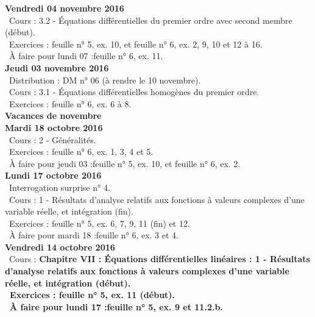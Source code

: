 \documentclass[12pt,a4paper]{article}
\begin{document}
\noindent\textbf{Vendredi 04 novembre 2016}\\
\bu\ Cours : 3.2 - Équations différentielles du premier ordre avec 
second membre (début).\\
\bu\ Exercices : feuille n° 5, ex. 10, et feuille n° 6, ex. 2, 9, 10 et 12 à 16.\\
\bu\ À faire pour lundi 07 :feuille n° 6, ex. 11.\vspace{.4cm}\\

\noindent\textbf{Jeudi 03 novembre 2016}\\
\bu\ Distribution : DM n° 06 (à rendre le 10 novembre).\\
\bu\ Cours : 3.1 - Équations différentielles homogènes du premier ordre.\\
\bu\ Exercices : feuille n° 6, ex. 6 à 8.\vspace{.4cm}\\

\noindent\textbf{ Vacances de novembre }\vspace{.4cm}\\

\noindent\textbf{\bf Mardi 18 octobre 2016}\\
\bu\ Cours : 2 - Généralités.\\
\bu\ Exercices : feuille n° 6, ex. 1, 3, 4 et 5.\\
\bu\ À faire pour jeudi 03 :feuille n° 5, ex. 10, et feuille n° 6, ex. 2.\vspace{.4cm}\\

\noindent\textbf{Lundi 17 octobre 2016}\\
\bu\ Interrogation surprise n° 4.\\
\bu\ Cours : 1 - Résultats d'analyse relatifs aux fonctions à valeurs complexes d'une variable réelle, et 
intégration (fin).\\
\bu\ Exercices : feuille n° 5, ex. 6, 7, 9, 11 (fin) et 12.\\
\bu\ À faire pour mardi 18 :feuille n° 6, ex. 3 et 4.\vspace{.4cm}\\
   
\noindent\textbf{Vendredi 14 octobre 2016}\\
\bu\ Cours : \bf Chapitre VII \rm : Équations différentielles linéaires : 1 - Résultats d'analyse relatifs aux 
fonctions à valeurs complexes d'une variable réelle, et intégration (début).\\
\bu\ Exercices : feuille n° 5, ex. 11 (début).\\
\bu\ À faire pour lundi 17 :feuille n° 5, ex. 9 et 11.2.b.\vspace{.4cm}\\
\end{document}
